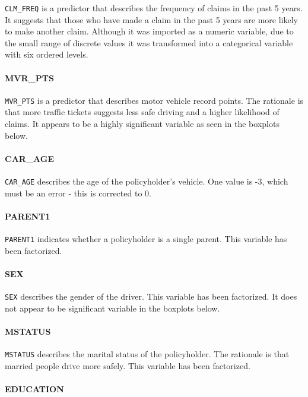 \documentclass[]{article}
\let\oldparagraph\paragraph
\renewcommand{\paragraph}[1]{\oldparagraph{#1}\mbox{}}
\begin{document}
\texttt{CLM\_FREQ} is a predictor that describes the frequency of claims
in the past 5 years. It suggests that those who have made a claim in the
past 5 years are more likely to make another claim. Although it was
imported as a numeric variable, due to the small range of discrete
values it was transformed into a categorical variable with six ordered
levels.

\paragraph{MVR\_PTS}\label{mvr_pts}

\texttt{MVR\_PTS} is a predictor that describes motor vehicle record
points. The rationale is that more traffic tickets suggests less safe
driving and a higher likelihood of claims. It appears to be a highly
significant variable as seen in the boxplots below.

\paragraph{CAR\_AGE}\label{car_age}

\texttt{CAR\_AGE} describes the age of the policyholder's vehicle. One
value is -3, which must be an error - this is corrected to 0.

\paragraph{PARENT1}\label{parent1}

\texttt{PARENT1} indicates whether a policyholder is a single parent.
This variable has been factorized.

\paragraph{SEX}\label{sex}

\texttt{SEX} describes the gender of the driver. This variable has been
factorized. It does not appear to be significant variable in the
boxplots below.

\paragraph{MSTATUS}\label{mstatus}

\texttt{MSTATUS} describes the marital status of the policyholder. The
rationale is that married people drive more safely. This variable has
been factorized.

\paragraph{EDUCATION}\label{education}
\end{document}
